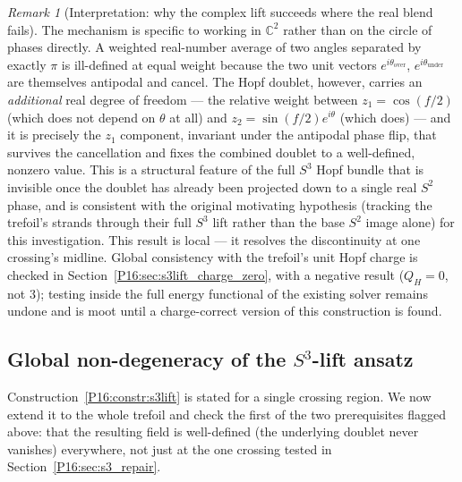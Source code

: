 \documentclass[11pt,a4paper]{article}
\theoremstyle{definition}\newtheorem{definition}[theorem]{Definition}
\theoremstyle{remark}
\newtheorem{remark}[theorem]{Remark}
\theoremstyle{definition}\newtheorem{construction}[theorem]{Construction}
\newcommand{\QH}{Q_H}
\begin{document}
\begin{remark}[Interpretation: why the complex lift succeeds where the
  real blend fails]
\label{P16:rem:why_s3_works}
The mechanism is specific to working in $\mathbb{C}^2$ rather than on
the circle of phases directly. A weighted real-number average of two
angles separated by exactly $\pi$ is ill-defined at equal weight
because the two unit vectors $e^{i\theta_{\mathrm{over}}}$,
$e^{i\theta_{\mathrm{under}}}$ are themselves antipodal and cancel.
The Hopf doublet, however, carries an \emph{additional} real degree
of freedom --- the relative weight between $z_1=\cos(f/2)$ (which
does not depend on $\theta$ at all) and $z_2=\sin(f/2)e^{i\theta}$
(which does) --- and it is precisely the $z_1$ component, invariant
under the antipodal phase flip, that survives the cancellation and
fixes the combined doublet to a well-defined, nonzero value. This is
a structural feature of the full $S^3$ Hopf bundle that is invisible
once the doublet has already been projected down to a single real
$S^2$ phase, and is consistent with the original motivating
hypothesis (tracking the trefoil's strands through their full $S^3$
lift rather than the base $S^2$ image alone) for this investigation.
This result is local --- it resolves the discontinuity at one
crossing's midline. Global consistency with the trefoil's unit Hopf
charge is checked in Section~\ref{P16:sec:s3lift_charge_zero}, with a
negative result ($\QH=0$, not $3$); testing inside the full energy
functional of the existing solver remains undone and is moot until a
charge-correct version of this construction is found.
\end{remark}

\subsection{Global non-degeneracy of the $S^3$-lift ansatz}
\label{P16:sec:global_nondegen}

Construction~\ref{P16:constr:s3lift} is stated for a single crossing
region. We now extend it to the whole trefoil and check the first of
the two prerequisites flagged above: that the resulting field is
well-defined (the underlying doublet never vanishes) everywhere, not
just at the one crossing tested in
Section~\ref{P16:sec:s3_repair}.
\end{document}
